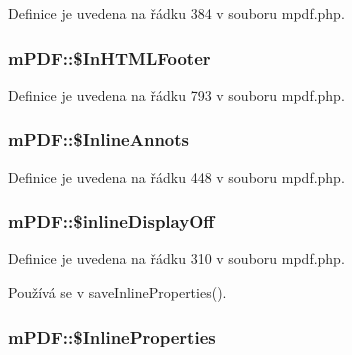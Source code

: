 Definice je uvedena na řádku 384 v souboru mpdf.\-php.

\hypertarget{classm_p_d_f_a1f51c3f69f2168e9ac13adfbae24c805}{
\subsubsection[{\$\-In\-H\-T\-M\-L\-Footer}]{\setlength{\rightskip}{0pt plus 5cm}m\-P\-D\-F\-::\$\-In\-H\-T\-M\-L\-Footer}}\label{classm_p_d_f_a1f51c3f69f2168e9ac13adfbae24c805}


Definice je uvedena na řádku 793 v souboru mpdf.\-php.

\hypertarget{classm_p_d_f_a62e0050547e82607ae6e42b77ddfb385}{
\subsubsection[{\$\-Inline\-Annots}]{\setlength{\rightskip}{0pt plus 5cm}m\-P\-D\-F\-::\$\-Inline\-Annots}}\label{classm_p_d_f_a62e0050547e82607ae6e42b77ddfb385}


Definice je uvedena na řádku 448 v souboru mpdf.\-php.

\hypertarget{classm_p_d_f_a240d08fa5b6f5cd83646757d855d959a}{
\subsubsection[{\$inline\-Display\-Off}]{\setlength{\rightskip}{0pt plus 5cm}m\-P\-D\-F\-::\$inline\-Display\-Off}}\label{classm_p_d_f_a240d08fa5b6f5cd83646757d855d959a}


Definice je uvedena na řádku 310 v souboru mpdf.\-php.



Používá se v save\-Inline\-Properties().

\hypertarget{classm_p_d_f_abf8ac99b19e35b0f546a7935f67e8116}{
\subsubsection[{\$\-Inline\-Properties}]{\setlength{\rightskip}{0pt plus 5cm}m\-P\-D\-F\-::\$\-Inline\-Properties}}\label{classm_p_d_f_abf8ac99b19e35b0f546a7935f67e8116}


